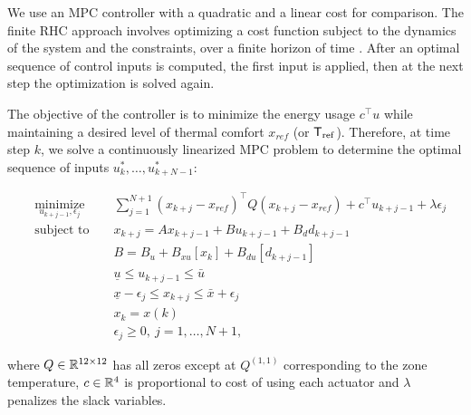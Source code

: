 We use an MPC controller with a quadratic and a linear cost for comparison.
The finite RHC approach involves optimizing a cost function subject to the dynamics of the system and the constraints, over a finite horizon of time \cite{Mayne2000}. After an optimal sequence of control inputs is computed, the first input is applied, then at the next step the optimization is solved again.


The objective of the controller is to minimize the energy usage $c^\top u$ while maintaining a desired level of thermal comfort $x_{ref}$ (or $\mathsf{T}_\mathrm{ref}$).
Therefore, at time step $k$, we solve a continuously linearized MPC problem to determine the optimal sequence of inputs $u^*_{k},\dots,u^*_{k+N-1}$:

\begin{subequations}
	\begin{align}
		& \underset{u_{k+j-1},\epsilon_j}{\text{minimize}} & & \sum_{j=1}^{N+1} ({x}_{k+j} - x_{ref})^\top Q ({x}_{k+j} - x_{ref}) + c^\top u_{k+j-1} +  \lambda\epsilon_j                                                                                                                          \\
		& \text{subject to }                               & & x_{k+j} = Ax_{k+j-1} + B u_{k+j-1} + B_d d_{k+j-1}\label{SE:mpc1}                   \\
		&                                                  & & B       = B_u + B_{xu}[x_{k}] + B_{du}[d_{k+j-1}] \label{SE:mpc2}                   \\
		&                                                  & & \underline{u} \leq u_{k+j-1} \leq \bar{u}                                           \\
		&                                                  & & \underline{x} - \epsilon_j \leq x_{k+j} \leq \bar{x} + \epsilon_j                   \\
		&                                                  & & x_k = x(k)                                                                          \\
		&                                                  & & \epsilon_j \geq 0, \ j = 1,\dots,N+1,            									                 
	\end{align}\label{E:mpc}
\end{subequations} 

\noindent where $Q \in \mathbb{R}^{12 \times 12}$ has all zeros except at $Q^{(1,1)}$ corresponding to the zone temperature, $c \in \mathbb{R}^{4}$ is proportional to cost of using each actuator and $\lambda$ penalizes the slack variables.